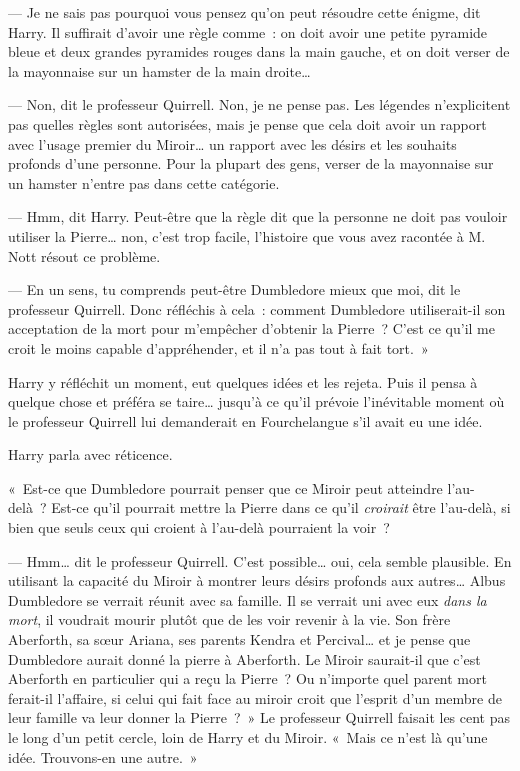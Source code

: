 --- Je ne sais pas pourquoi vous pensez qu'on peut résoudre cette énigme, dit Harry.
Il suffirait d'avoir une règle comme~: on doit avoir une petite pyramide bleue et deux grandes pyramides rouges dans la main gauche, et on doit verser de la mayonnaise sur un hamster de la main droite…

--- Non, dit le professeur Quirrell.
Non, je ne pense pas.
Les légendes n'explicitent pas quelles règles sont autorisées, mais je pense que cela doit avoir un rapport avec l'usage premier du Miroir… un rapport avec les désirs et les souhaits profonds d'une personne.
Pour la plupart des gens, verser de la mayonnaise sur un hamster n'entre pas dans cette catégorie.

--- Hmm, dit Harry.
Peut-être que la règle dit que la personne ne doit pas vouloir utiliser la Pierre… non, c'est trop facile, l'histoire que vous avez racontée à M. Nott résout ce problème.

--- En un sens, tu comprends peut-être Dumbledore mieux que moi, dit le professeur Quirrell.
Donc réfléchis à cela~: comment Dumbledore utiliserait-il son acceptation de la mort pour m'empêcher d'obtenir la Pierre~?
C'est ce qu'il me croit le moins capable d'appréhender, et il n'a pas tout à fait tort.~»

Harry y réfléchit un moment, eut quelques idées et les rejeta.
Puis il pensa à quelque chose et préféra se taire… jusqu'à ce qu'il prévoie l'inévitable moment où le professeur Quirrell lui demanderait en Fourchelangue s'il avait eu une idée.

Harry parla avec réticence.

«~Est-ce que Dumbledore pourrait penser que ce Miroir peut atteindre l'au-delà~?
Est-ce qu'il pourrait mettre la Pierre dans ce qu'il \emph{croirait} être l'au-delà, si bien que seuls ceux qui croient à l'au-delà pourraient la voir~?

--- Hmm… dit le professeur Quirrell.
C'est possible… oui, cela semble plausible.
En utilisant la capacité du Miroir à montrer leurs désirs profonds aux autres…
Albus Dumbledore se verrait réunit avec sa famille.
Il se verrait uni avec eux \emph{dans la mort}, il voudrait mourir plutôt que de les voir revenir à la vie.
Son frère Aberforth, sa sœur Ariana, ses parents Kendra et Percival… et je pense que Dumbledore aurait donné la pierre à Aberforth.
Le Miroir saurait-il que c'est Aberforth en particulier qui a reçu la Pierre~?
Ou n'importe quel parent mort ferait-il l'affaire, si celui qui fait face au miroir croit que l'esprit d'un membre de leur famille va leur donner la Pierre~?~»
Le professeur Quirrell faisait les cent pas le long d'un petit cercle, loin de Harry et du Miroir.
«~Mais ce n'est là qu'une idée.
Trouvons-en une autre.~»

